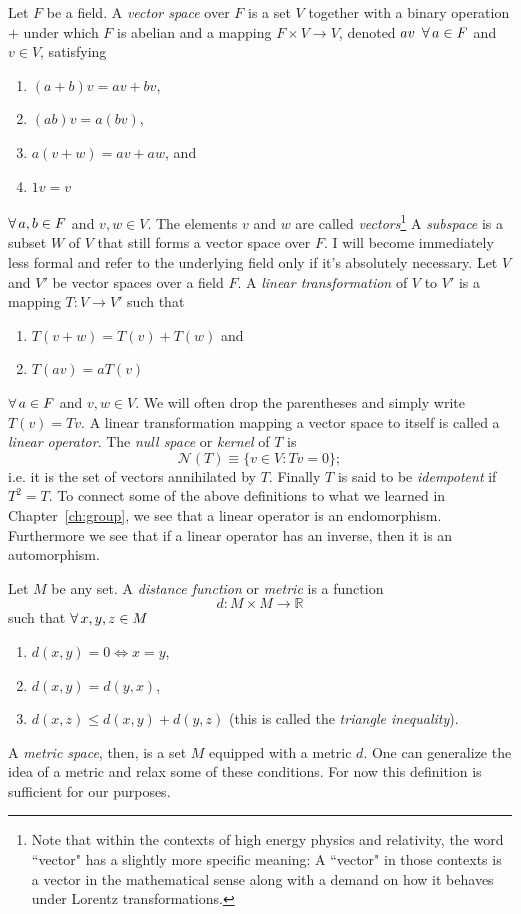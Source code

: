   Let $F$ be a field. A {\it vector space} over $F$ is a set
  $V$ together with a binary operation $+$ under which $F$ is abelian and a
  mapping $F\times V\to V$, denoted $av\ \operatorname{\forall} a\in F$ and $v\in V$,
  satisfying
  \begin{enumerate}
    \item $(a+b)v=av+bv$,
    \item $(ab)v=a(bv)$,
    \item $a(v+w)=av+aw$, and
    \item $1v=v$
  \end{enumerate}
  $\operatorname{\forall} a,b\in F$ and $v,w\in V$. The elements $v$ and $w$ are
  called {\it vectors}\footnote{Note that within the contexts of high
  energy physics and relativity, the word ``vector" has a slightly more
  specific meaning: A ``vector" in those contexts is a vector in the
  mathematical sense along with a demand on how it behaves under
  Lorentz transformations.} A {\it subspace} 
  is a subset $W$ of
  $V$ that still forms a vector space over $F$. I will become immediately
  less formal and refer to the underlying field only if it's absolutely
  necessary.
  Let $V$ and $V'$ be vector spaces over a field $F$. A
  {\it linear transformation} 
  of $V$ to $V'$ is a mapping $T : V\to V'$ such that
  \begin{enumerate}
    \item $T(v+w)=T(v)+T(w)$ and
    \item $T(av)=aT(v)$
  \end{enumerate}
  $\operatorname{\forall} a\in F$ and $v,w\in V$. We will often drop the parentheses
  and simply write $T(v)=Tv$. A linear transformation mapping a
  vector space to itself is called a {\it linear operator}.
  The {\it null space} or {\it kernel} of $T$ is
  \begin{equation}
    \mathcal{N}(T)\equiv\{v\in V:Tv=0\};
  \end{equation}
  i.e. it is the set of vectors annihilated by $T$. Finally $T$ is said
  to be {\it idempotent} if $T^2=T$.
To connect some of the above definitions to what we learned in
Chapter~\ref{ch:group}, we see that a linear operator is an endomorphism.
Furthermore we see that if a linear operator has an inverse, then it
is an automorphism.

  Let $M$ be any set. A {\it distance function} or {\it metric}
  is a function
  $$d:M\times M\to \mathbb{R}$$
  such that $\operatorname{\forall} x,y,z\in M$
  \begin{enumerate}
    \item $d(x,y)=0\Leftrightarrow x=y$,
    \item $d(x,y)=d(y,x)$,
    \item $d(x,z)\leq d(x,y)+d(y,z)$ (this is called the {\it triangle
          inequality}).
  \end{enumerate}
  A {\it metric space}, then, is a set $M$ equipped with a metric $d$.
One can generalize the idea of a metric and relax some of these
conditions. For now this definition is sufficient for our purposes.

